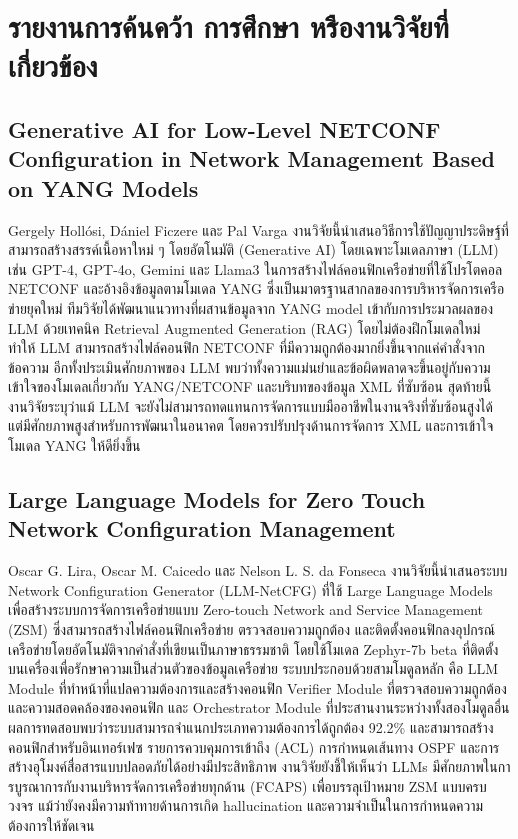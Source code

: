 \section{รายงานการค้นคว้า การศึกษา หรืองานวิจัยที่เกี่ยวข้อง}

\subsection{Generative AI for Low-Level NETCONF
 Configuration in Network Management Based on
 YANG Models}
\hspace*{1.3em} %
Gergely Hollósi, Dániel Ficzere และ Pal Varga งานวิจัยนี้นำเสนอวิธีการใช้ปัญญาประดิษฐ์ที่สามารถสร้างสรรค์เนื้อหาใหม่ ๆ โดยอัตโนมัติ (Generative AI) โดยเฉพาะโมเดลภาษา (LLM) เช่น GPT-4, GPT-4o, Gemini และ Llama3 ในการสร้างไฟล์คอนฟิกเครือข่ายที่ใช้โปรโตคอล NETCONF และอ้างอิงข้อมูลตามโมเดล YANG ซึ่งเป็นมาตรฐานสากลของการบริหารจัดการเครือข่ายยุคใหม่ ทีมวิจัยได้พัฒนาแนวทางที่ผสานข้อมูลจาก YANG model เข้ากับการประมวลผลของ LLM ด้วยเทคนิค Retrieval Augmented Generation (RAG) โดยไม่ต้องฝึกโมเดลใหม่ ทำให้ LLM สามารถสร้างไฟล์คอนฟิก NETCONF ที่มีความถูกต้องมากยิ่งขึ้นจากแค่คำสั่งจากข้อความ อีกทั้งประเมินศักยภาพของ LLM พบว่าทั้งความแม่นยำและข้อผิดพลาดจะขึ้นอยู่กับความเข้าใจของโมเดลเกี่ยวกับ YANG/NETCONF และบริบทของข้อมูล XML ที่ซับซ้อน สุดท้ายนี้ งานวิจัยระบุว่าแม้ LLM จะยังไม่สามารถทดแทนการจัดการแบบมืออาชีพในงานจริงที่ซับซ้อนสูงได้ แต่มีศักยภาพสูงสำหรับการพัฒนาในอนาคต โดยควรปรับปรุงด้านการจัดการ XML และการเข้าใจโมเดล YANG ให้ดียิ่งขึ้น \parencite{paper1}

\subsection{Large Language Models for Zero Touch Network Configuration Management}
\hspace*{1.3em} %
Oscar G. Lira, Oscar M. Caicedo และ Nelson L. S. da Fonseca งานวิจัยนี้นำเสนอระบบ Network Configuration Generator (LLM-NetCFG) ที่ใช้ Large Language Models เพื่อสร้างระบบการจัดการเครือข่ายแบบ Zero-touch Network and Service Management (ZSM) ซึ่งสามารถสร้างไฟล์คอนฟิกเครือข่าย ตรวจสอบความถูกต้อง และติดตั้งคอนฟิกลงอุปกรณ์เครือข่ายโดยอัตโนมัติจากคำสั่งที่เขียนเป็นภาษาธรรมชาติ โดยใช้โมเดล Zephyr-7b beta ที่ติดตั้งบนเครื่องเพื่อรักษาความเป็นส่วนตัวของข้อมูลเครือข่าย ระบบประกอบด้วยสามโมดูลหลัก คือ LLM Module ที่ทำหน้าที่แปลความต้องการและสร้างคอนฟิก Verifier Module ที่ตรวจสอบความถูกต้องและความสอดคล้องของคอนฟิก และ Orchestrator Module ที่ประสานงานระหว่างทั้งสองโมดูลอื่น ผลการทดสอบพบว่าระบบสามารถจำแนกประเภทความต้องการได้ถูกต้อง 92.2\% และสามารถสร้างคอนฟิกสำหรับอินเทอร์เฟซ รายการควบคุมการเข้าถึง (ACL) การกำหนดเส้นทาง OSPF และการสร้างอุโมงค์สื่อสารแบบปลอดภัยได้อย่างมีประสิทธิภาพ งานวิจัยยังชี้ให้เห็นว่า LLMs มีศักยภาพในการบูรณาการกับงานบริหารจัดการเครือข่ายทุกด้าน (FCAPS) เพื่อบรรลุเป้าหมาย ZSM แบบครบวงจร แม้ว่ายังคงมีความท้าทายด้านการเกิด hallucination และความจำเป็นในการกำหนดความต้องการให้ชัดเจน \parencite{paper4}

